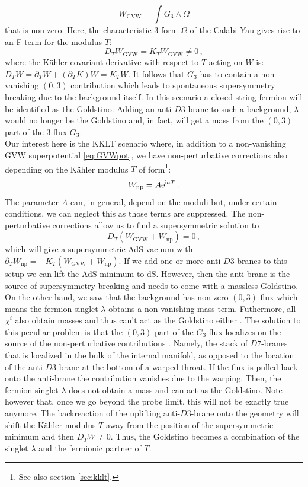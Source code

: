 \documentclass[a4paper,12pt]{report}
\newcommand{\be}{\begin{equation}}
\newcommand{\ee}{\end{equation}}
\def\rmi{{\rm i}}
\def\rme{{\rm e}}
\begin{document}
\be 
W_{\text{GVW}} = \int G_3 \wedge \Omega
\label{eq:GVWpot}
\ee
that is non-zero. Here, the characteristic 3-form $\Omega$ of the Calabi-Yau gives rise to an F-term for the modulus $T$:
\be 
D_T W_{\text{GVW}} = K_T W_{\text{GVW}} \neq 0\,,
\ee
where the Kähler-covariant derivative with respect to $T$ acting on $W$ is: $D_T W = \partial_T W + (\partial_T K ) W = K_T W$. It follows that $G_3$ has to contain a non-vanishing $(0,3)$ contribution which leads to spontaneous supersymmetry breaking due to the background itself. In this scenario a closed string fermion will be identified as the Goldstino. Adding an anti-$D3$-brane to such a background, $\lambda$ would no longer be the Goldstino and, in fact, will get a mass from the $(0,3)$ part of the 3-flux $G_3$.\\
Our interest here is the KKLT scenario where, in addition to a non-vanishing GVW superpotential \eqref{eq:GVWpot}, we have non-perturbative corrections also depending on the Kähler modulus $T$ of form\footnote{See also section \ref{sec:kklt}.}:
\be 
W_{\text{np}} = A \rme^{\rmi a T}\,.
\ee
The parameter $A$ can, in general, depend on the moduli but, under certain conditions, we can neglect this as those terms are suppressed. The non-perturbative corrections allow us to find a supersymmetric solution to 
\be 
D_T \left( W_{\text{GVW}} + W_{\text{np}} \right)=0\,,
\ee
which will give a supersymmetric AdS vacuum with $\partial_T W_{\text{np}} = - K_T (W_{\text{GVW}} + W_{\text{np}})$. If we add one or more anti-$D3$-branes to this setup we can lift the AdS minimum to dS. However, then the anti-brane is the source of supersymmetry breaking and needs to come with a massless Goldstino. On the other hand, we saw that the background has non-zero $(0,3)$ flux which means the fermion singlet $\lambda$ obtains a non-vanishing mass term. Futhermore, all $\chi^i$ also obtain masses and thus can't act as the Goldstino either \cite{Bergshoeff:2015jxa}. The solution to this peculiar problem is that the $(0,3)$ part of the $G_3$ flux localizes on the source of the non-perturbative contributions \cite{Baumann:2010sx,Dymarsky:2010mf}. Namely, the stack of $D7$-branes that is localized in the bulk of the internal manifold, as opposed to the location of the anti-$D3$-brane at the bottom of a warped throat. If the flux is pulled back onto the anti-brane the contribution vanishes due to the warping. Then, the fermion singlet $\lambda$ does not obtain a mass and can act as the Goldstino. Note however that, once we go beyond the probe limit, this will not be exactly true anymore. The backreaction of the uplifting anti-$D3$-brane onto the geometry will shift the Kähler modulus $T$ away from the position of the supersymmetric minimum and then $D_TW\neq0$. Thus, the Goldstino becomes a combination of the singlet $\lambda$ and the fermionic partner of $T$.\\
\end{document}
